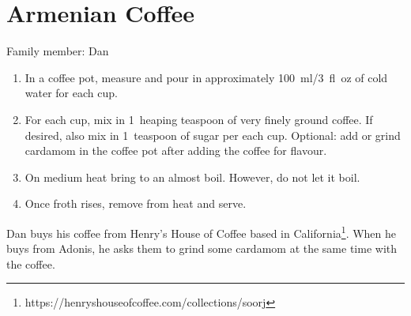 \chapter{Armenian Coffee}
\label{ch:armeniancoffee}



Family member: Dan

\begin{enumerate}
    \item In a coffee pot, measure and pour in approximately 100~ml/3~fl~oz of cold water for each cup.
    \item For each cup, mix in 1~heaping teaspoon of very finely ground coffee. If desired, also mix in 1~teaspoon of sugar per each cup. Optional: add or grind cardamom in the coffee pot after adding the coffee for flavour.
    \item On medium heat bring to an almost boil. However, do not let it boil.
    \item Once froth rises, remove from heat and serve.
\end{enumerate}

Dan buys his coffee from Henry's House of Coffee based in California\footnote{https://henryshouseofcoffee.com/collections/soorj}. When he buys from Adonis, he asks them to grind some cardamom at the same time with the coffee.
